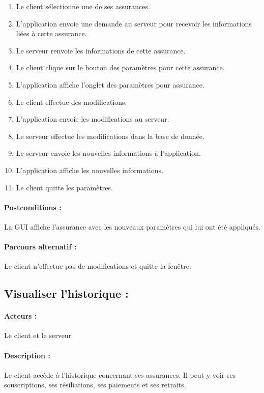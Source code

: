 \documentclass[../annexe.tex]{subfiles}
\begin{document}
	\begin{enumerate}
		\item Le client sélectionne une de ses assurances.
		\item L'application envoie une demande au serveur pour recevoir les informations liées à cette assurance.
		\item Le serveur renvoie les informations de cette assurance.
		\item Le client clique sur le bouton des paramètres pour cette assurance.
		\item L'application affiche l'onglet des paramètres pour assurance.
		\item Le client effectue des modifications.
		\item L'application envoie les modifications au serveur.
		\item Le serveur effectue les modifications dans la base de donnée.
		\item Le serveur envoie les nouvelles informations à l'application.
		\item L'application affiche les nouvelles informations.
		\item Le client quitte les paramètres.
	\end{enumerate}

\paragraph{Postconditions :} La GUI affiche l'assurance avec les nouveaux paramètres qui lui ont été appliqués.

\paragraph{Parcours alternatif :} Le client n'effectue pas de modifications et quitte la fenêtre.

\newpage

\subsection{Visualiser l'historique :}

\paragraph{Acteurs :} Le client et le serveur 

\paragraph{Description :} Le client accède à l'historique concernant ses assurances. Il peut y voir ses souscriptions, ses résiliations, ses paiements et ses retraits.
\end{document}
